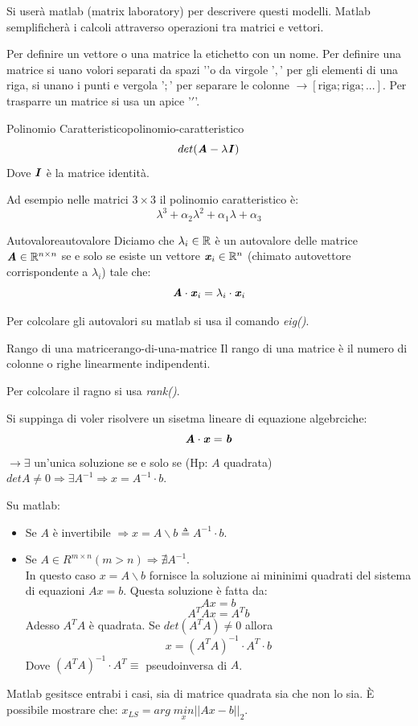 \documentclass[12pt]{article}
\begin{document}
Si user\`a  matlab (matrix laboratory) per descrivere questi modelli. Matlab semplificher\`a i calcoli attraverso operazioni tra matrici e vettori.

Per definire un vettore o una matrice la etichetto con un nome. Per definire una matrice si uano volori separati da spazi '$ $'o da virgole '$,$' per gli elementi di una riga, si unano i punti e vergola '$;$' per separare le colonne $\to [\text{riga};\text{riga}; ... ]$.
Per trasparre un matrice si usa un apice '$'$'.

\begin{definition}{Polinomio Caratteristico}{polinomio-caratteristico}
    \[ det(\textbf{\textit{A}}-\lambda \textbf{\textit{I}}) \]
    Dove $\textbf{\textit{I}}$ \`e la matrice identit\`a.
\end{definition}
Ad esempio nelle matrici $3\times 3$ il polinomio caratteristico \`e:
\[ \lambda^3 + \alpha_2\lambda^2 + \alpha_1\lambda + \alpha_3 \]
\begin{definition}{Autovalore}{autovalore}
    Diciamo che $\lambda_i \in \mathbb{R}$ \`e un autovalore delle matrice $\textbf{\textit{A}} \in \mathbb{R}^{n\times n}$ se e solo se esiste un vettore $\textbf{\textit{x}}_i \in \mathbb{R}^n$ (chimato autovettore corrispondente a $\lambda_i$) tale che:
    \[ \textbf{\textit{A}}\cdot  \textbf{\textit{x}}_i = \lambda_i \cdot \textbf{\textit{x}}_i \]
\end{definition}

Per colcolare gli autovalori su matlab si usa il comando \emph{eig()}.

\begin{definition}{Rango di una matrice}{rango-di-una-matrice}
    Il rango di una matrice \`e il numero di colonne o righe linearmente indipendenti.
\end{definition}
Per colcolare il ragno si usa \emph{rank()}.

Si suppinga di voler risolvere un sisetma lineare di equazione algebrciche:
\[ \textbf{\textit{A}}\cdot \textbf{\textit{x}} = \textbf{\textit{b}} \]
$\to \exists$ un'unica soluzione se e solo se (Hp: $A$ quadrata) $detA \neq 0 \Rightarrow \exists A^{-1} \Rightarrow \boxed{x = A^{-1}\cdot b}$.

Su matlab:
\begin{itemize}
    \item Se $A$ \`e invertibile $\Rightarrow \boxed{x = A\backslash b\triangleq A^{-1}\cdot b}$.
    \item Se $A \in R^{m\times n} (m > n) \Rightarrow \nexists A^{-1}$. \\
        In questo caso $x=A\backslash b$ fornisce la soluzione ai mininimi quadrati del sistema di equazioni $Ax =b$. Questa soluzione \`e fatta da:
        \[ Ax = b \]
        \[A^TAx = A^Tb \]
        Adesso $A^TA$ \`e quadrata. Se $det(A^TA) \neq 0$ allora
        \[ \boxed{x = (A^TA)^{-1}\cdot A^T\cdot b} \]
        Dove $(A^TA)^{-1}\cdot A^T \equiv$ pseudoinversa di $A$.
\end{itemize}
Matlab gesitsce entrabi i casi, sia di matrice quadrata sia che non lo sia. \`E possibile mostrare che: $x_{LS} = arg\;\underset{x}{min}|| Ax-b ||_2 $.
\end{document}

